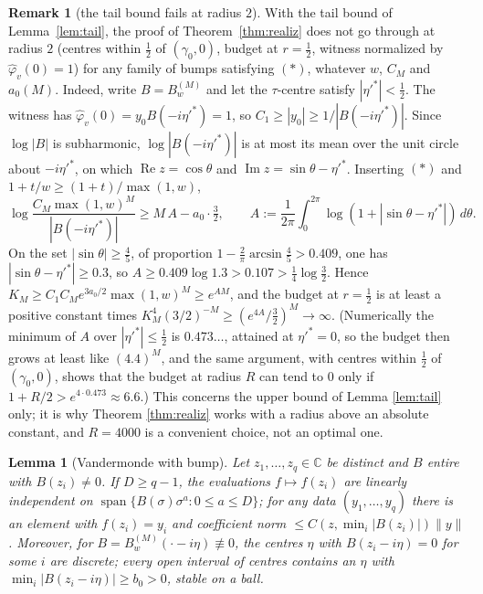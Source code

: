 \documentclass[11pt,reqno]{amsart}
\newtheorem{lemma}[theorem]{Lemma}
\theoremstyle{definition}
\newtheorem{remark}[theorem]{Remark}
\newcommand{\C}{\mathbb{C}}
\newcommand{\half}{\tfrac12}
\begin{document}
\begin{remark}[the tail bound fails at radius \(2\)]\label{rem:pw-rigidity}
With the tail bound of Lemma~\ref{lem:tail}, the proof of Theorem~\ref{thm:realiz} does not go through at radius \(2\) (centres within \(\half\) of \((\gamma_0,0)\), budget at \(r=\half\), witness normalized by \(\hat\varphi_v(0)=1\)) for any family of bumps satisfying \((\ast)\), whatever \(w\), \(C_M\) and \(a_0(M)\). Indeed, write \(B=B^{(M)}_w\) and let the \(\tau\)-centre satisfy
\(|\eta'^*|<\half\). The witness has
\(\hat\varphi_v(0)=y_0B(-i\eta'^*)=1\), so \(C_1\geq|y_0|\geq
1/|B(-i\eta'^*)|\). Since \(\log|B|\) is subharmonic, \(\log|B(-i\eta'^*)|\)
is at most its mean over the unit circle about \(-i\eta'^*\), on which
\(\operatorname{Re}z=\cos\theta\) and
\(\operatorname{Im}z=\sin\theta-\eta'^*\). Inserting \((\ast)\) and
\(1+t/w\geq(1+t)/\max(1,w)\),
\[
\log\frac{C_M\max(1,w)^M}{|B(-i\eta'^*)|}\geq M\,A-a_0\cdot\tfrac32,
\qquad A:=\frac1{2\pi}\int_0^{2\pi}\log(1+|\sin\theta-\eta'^*|)\,d\theta .
\]
On the set \(|\sin\theta|\geq\tfrac45\), of proportion
\(1-\tfrac2\pi\arcsin\tfrac45>0.409\), one has
\(|\sin\theta-\eta'^*|\geq0.3\), so \(A\geq0.409\log1.3>0.107>\tfrac14\log\tfrac32\).
Hence \(K_M\geq C_1C_Me^{3a_0/2}\max(1,w)^M\geq e^{AM}\), and the budget at
\(r=\half\) is at least a positive constant times
\(K_M^4(3/2)^{-M}\geq(e^{4A}/\tfrac32)^M\to\infty\). (Numerically the
minimum of \(A\) over \(|\eta'^*|\leq\half\) is \(0.473\ldots\), attained at
\(\eta'^*=0\), so the budget then grows at least like \((4.4)^M\), and the
same argument, with centres within \(\half\) of \((\gamma_0,0)\), shows that
the budget at radius \(R\) can tend to \(0\) only if
\(1+R/2>e^{4\cdot0.473}\approx6.6\).) This concerns the upper bound of Lemma
\ref{lem:tail} only; it is why Theorem \ref{thm:realiz} works with a radius
above an absolute constant, and \(R=4000\) is a convenient choice, not an
optimal one.
\end{remark}

\begin{lemma}[Vandermonde with bump]\label{lem:vandermonde}
Let \(z_1,\dots,z_q\in\C\) be distinct and \(B\) entire with \(B(z_i)\neq0\). If
\(D\geq q-1\), the evaluations \(f\mapsto f(z_i)\) are linearly independent on
\(\operatorname{span}\{B(\sigma)\sigma^a:0\leq a\leq D\}\); for any data
\((y_1,\dots,y_q)\) there is an element with \(f(z_i)=y_i\) and coefficient norm
\(\leq C(z,\min_i|B(z_i)|)\|y\|\). Moreover, for
\(B=B^{(M)}_w(\cdot-i\eta)\not\equiv0\), the centres \(\eta\) with
\(B(z_i-i\eta)=0\) for some \(i\) are discrete; every open interval of centres
contains an \(\eta\) with \(\min_i|B(z_i-i\eta)|\geq b_0>0\), stable on a ball.
\end{lemma}
\end{document}
